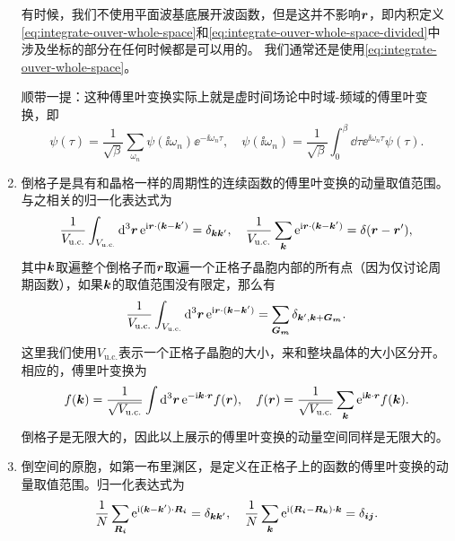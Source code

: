 \begin{enumerate}
    有时候，我们不使用平面波基底展开波函数，但是这并不影响$\vb*{r}$，即内积定义\eqref{eq:integrate-ouver-whole-space}和\eqref{eq:integrate-ouver-whole-space-divided}中涉及坐标的部分在任何时候都是可以用的。
    我们通常还是使用\eqref{eq:integrate-ouver-whole-space}。

    顺带一提：这种傅里叶变换实际上就是虚时间场论中时域-频域的傅里叶变换，即
    \begin{equation}
        \psi(\tau) = \frac{1}{\sqrt{\beta}} \sum_{\omega_n} \psi(\ii \omega_n) \ee^{- \ii \omega_n \tau}, \quad \psi(\ii \omega_n) = \frac{1}{\sqrt{\beta}} \int_0^\beta \dd{\tau} \ee^{\ii \omega_n \tau} \psi(\tau).
        \label{eq:imaginary-fourier}
    \end{equation}

    \item 倒格子是具有和晶格一样的周期性的连续函数的傅里叶变换的动量取值范围。与之相关的归一化表达式为
    \begin{equation}
        \frac{1}{V_\text{u.c.}} \int_{V_\text{u.c.}} \dd[3]{\vb*{r}} \mathrm{e}^{\mathrm{i} \vb*{r} \cdot (\vb*{k} - \vb*{k}')} = \delta_{\vb*{k} \vb*{k}'}, \quad \frac{1}{V_\text{u.c.}} \sum_{\vb*{k}} \mathrm{e}^{\mathrm{i} \vb*{r} \cdot (\vb*{k} - \vb*{k}')} = \delta(\vb*{r} - \vb*{r}'), 
        \label{eq:normalization-periodic}
    \end{equation}
    其中$\vb*{k}$取遍整个倒格子而$\vb*{r}$取遍一个正格子晶胞内部的所有点（因为仅讨论周期函数），如果$\vb*{k}$的取值范围没有限定，那么有%
    \begin{equation}
        \frac{1}{V_\text{u.c.}} \int_{V_\text{u.c.}} \dd[3]{\vb*{r}} \mathrm{e}^{\mathrm{i} \vb*{r} \cdot (\vb*{k} - \vb*{k}')} = \sum_{\vb*{G}_{\vb*{m}}} \delta_{\vb*{k}', \vb*{k} + \vb*{G}_{\vb*{m}}}.
    \end{equation}
    这里我们使用$V_\text{u.c.}$表示一个正格子晶胞的大小，来和整块晶体的大小区分开。相应的，傅里叶变换为
    \begin{equation}
        f(\vb*{k}) = \frac{1}{\sqrt{V_\text{u.c.}}} \int \dd[3]{\vb*{r}} \mathrm{e}^{- \mathrm{i} \vb*{k} \cdot \vb*{r}} f(\vb*{r}), \quad f(\vb*{r}) = \frac{1}{\sqrt{V_\text{u.c.}}} \sum_{\vb*{k}} \mathrm{e}^{\mathrm{i} \vb*{k} \cdot \vb*{r}} f(\vb*{k}).
    \end{equation}
    倒格子是无限大的，因此以上展示的傅里叶变换的动量空间同样是无限大的。
    \item 倒空间的原胞，如第一布里渊区，是定义在正格子上的函数的傅里叶变换的动量取值范围。归一化表达式为
    \begin{equation}
        \frac{1}{N} \sum_{\vb*{R}_{\vb*{i}}} \ee^{\ii (\vb*{k} - \vb*{k}') \cdot \vb*{R}_{\vb*{i}}} = \delta_{\vb*{k} \vb*{k}'}, \quad \frac{1}{N} \sum_{\vb*{k}} \ee^{\ii (\vb*{R}_{\vb*{i}} - \vb*{R}_{\vb*{k}}) \cdot \vb*{k}} = \delta_{\vb*{i} \vb*{j}}.

\end{equation}
\end{enumerate}
